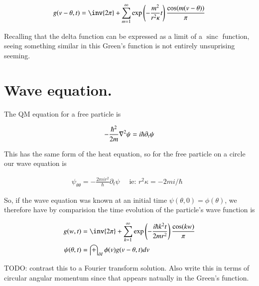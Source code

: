 \documentclass{article}
\DeclareMathOperator{\sinc}{sinc}
\begin{document}
\begin{align*}
g( v - \theta, t ) &= \inv{2 \pi} + \sum_{m=1}^\infty \exp\left(- \frac{m^2}{ r^2 \kappa } t \right) \frac{\cos(m (v -\theta))}{\pi} \\
\end{align*}

Recalling that the delta function can be expressed as a limit of a $\sinc$ function, seeing something similar
in this Green's function is not entirely unsuprising seeming.

\section{ Wave equation. }

The QM equation for a free particle is

\begin{align*}
-\frac{\hbar^2}{2m} \nabla^2 \psi = i \hbar \partial_t \psi
\end{align*}

This has the same form of the heat equation, so for the free particle on a circle our wave equation is

\begin{align*}
\psi_{\theta\theta} = - \frac{2 m i r^2 }{\hbar} \partial_t \psi \quad \mbox{ ie: $r^2 \kappa = - 2 m i /\hbar$ }
\end{align*}

So, if the wave equation was known at an initial time $\psi(\theta, 0) = \phi(\theta)$, we therefore have by comparision the time 
evolution of the particle's wave function is

\begin{align*}
g( w, t ) &= \inv{2 \pi} + \sum_{k=1}^\infty \exp\left(- \frac{i \hbar k^2 t}{ 2 m r^2 } \right) \frac{\cos(k w )}{\pi} \\
\psi(\theta, t) &= \int_{\partial I} \phi(v) g(v - \theta, t) dv 
\end{align*}

TODO: contrast this to a Fourier transform solution.  Also write this in terms of circular angular momentum since that appears natually in the Green's function.

%
%
\end{document}
